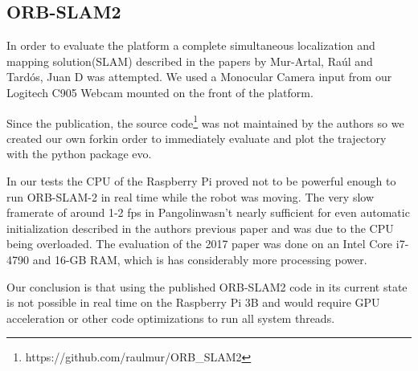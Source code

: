 \documentclass[class=report, crop=false]{standalone}
\begin{document}
\subsection{ORB-SLAM2}\label{subsec:orbslam2}

In order to evaluate the platform a complete simultaneous localization and mapping solution(SLAM) described in the papers\cite{mur2017orb}\cite{mur2015orb} by Mur-Artal, Ra\'ul and Tard{\'o}s, Juan D was attempted. We used a Monocular Camera input from our Logitech C905 Webcam mounted on the front of the platform.

Since the publication, the source code\footnote{https://github.com/raulmur/ORB\_SLAM2} was not maintained by the authors so we created our own fork\footnotemark in order to immediately evaluate and plot the trajectory with the python package evo\cite{grupp2017evo}.


In our tests the CPU of the Raspberry Pi proved not to be powerful enough to run ORB-SLAM-2 in real time while the robot was moving. The very slow framerate of around 1-2 fps in Pangolin\footnotemark wasn't nearly sufficient for even automatic initialization described in the authors previous paper\cite{mur2015orb} and was due to the CPU being overloaded. The evaluation of the 2017 paper\cite{mur2017orb} was done on an Intel Core i7-4790 and 16-GB RAM, which is has considerably more processing power.


Our conclusion is that using the published ORB-SLAM2 code in its current state is not possible in real time on the Raspberry Pi 3B and would require GPU acceleration or other code optimizations to run all system threads.
\end{document}
